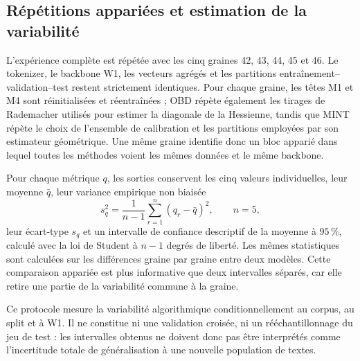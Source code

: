 \subsection{Répétitions appariées et estimation de la variabilité}
\label{ssec:methode_repetitions}

L'expérience complète est répétée avec les cinq graines 42, 43, 44, 45 et 46.
Le tokenizer, le backbone W1, les vecteurs agrégés et les partitions
entraînement--validation--test restent strictement identiques. Pour chaque
graine, les têtes M1 et M4 sont réinitialisées et réentraînées ; OBD répète
également les tirages de Rademacher utilisés pour estimer la diagonale de la
Hessienne, tandis que MINT répète le choix de l'ensemble de calibration et les
partitions employées par son estimateur géométrique. Une même graine identifie
donc un bloc apparié dans lequel toutes les méthodes voient les mêmes données
et le même backbone.

Pour chaque métrique $q$, les sorties conservent les cinq valeurs individuelles,
leur moyenne $\bar q$, leur variance empirique non biaisée
\begin{equation}
    s_q^2=\frac{1}{n-1}\sum_{r=1}^{n}(q_r-\bar q)^2,
    \qquad n=5,
\end{equation}
leur écart-type $s_q$ et un intervalle de confiance descriptif de la moyenne à
$95\,\%$, calculé avec la loi de Student à $n-1$ degrés de liberté. Les mêmes
statistiques sont calculées sur les différences graine par graine entre deux
modèles. Cette comparaison appariée est plus informative que deux intervalles
séparés, car elle retire une partie de la variabilité commune à la graine.

Ce protocole mesure la variabilité algorithmique conditionnellement au corpus,
au split et à W1. Il ne constitue ni une validation croisée, ni un rééchantillonnage
du jeu de test : les intervalles obtenus ne doivent donc pas être interprétés
comme l'incertitude totale de généralisation à une nouvelle population de
textes.

